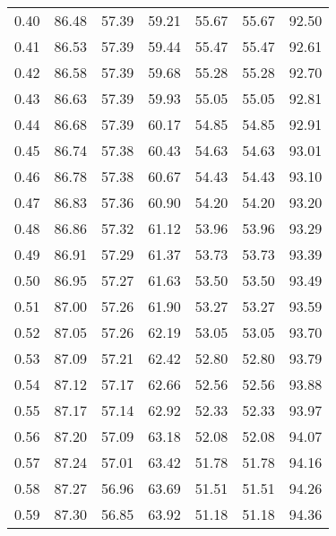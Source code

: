 \begin{tabular}{|c|c|c|c|c|c|c|}
      0.40 &     86.48 &     57.39 &      59.21 &   55.67 &      55.67 &         92.50 \\
      0.41 &     86.53 &     57.39 &      59.44 &   55.47 &      55.47 &         92.61 \\
      0.42 &     86.58 &     57.39 &      59.68 &   55.28 &      55.28 &         92.70 \\
      0.43 &     86.63 &     57.39 &      59.93 &   55.05 &      55.05 &         92.81 \\
      0.44 &     86.68 &     57.39 &      60.17 &   54.85 &      54.85 &         92.91 \\
      0.45 &     86.74 &     57.38 &      60.43 &   54.63 &      54.63 &         93.01 \\
      0.46 &     86.78 &     57.38 &      60.67 &   54.43 &      54.43 &         93.10 \\
      0.47 &     86.83 &     57.36 &      60.90 &   54.20 &      54.20 &         93.20 \\
      0.48 &     86.86 &     57.32 &      61.12 &   53.96 &      53.96 &         93.29 \\
      0.49 &     86.91 &     57.29 &      61.37 &   53.73 &      53.73 &         93.39 \\
      0.50 &     86.95 &     57.27 &      61.63 &   53.50 &      53.50 &         93.49 \\
      0.51 &     87.00 &     57.26 &      61.90 &   53.27 &      53.27 &         93.59 \\
      0.52 &     87.05 &     57.26 &      62.19 &   53.05 &      53.05 &         93.70 \\
      0.53 &     87.09 &     57.21 &      62.42 &   52.80 &      52.80 &         93.79 \\
      0.54 &     87.12 &     57.17 &      62.66 &   52.56 &      52.56 &         93.88 \\
      0.55 &     87.17 &     57.14 &      62.92 &   52.33 &      52.33 &         93.97 \\
      0.56 &     87.20 &     57.09 &      63.18 &   52.08 &      52.08 &         94.07 \\
      0.57 &     87.24 &     57.01 &      63.42 &   51.78 &      51.78 &         94.16 \\
      0.58 &     87.27 &     56.96 &      63.69 &   51.51 &      51.51 &         94.26 \\
      0.59 &     87.30 &     56.85 &      63.92 &   51.18 &      51.18 &         94.36 \\

\end{tabular}
